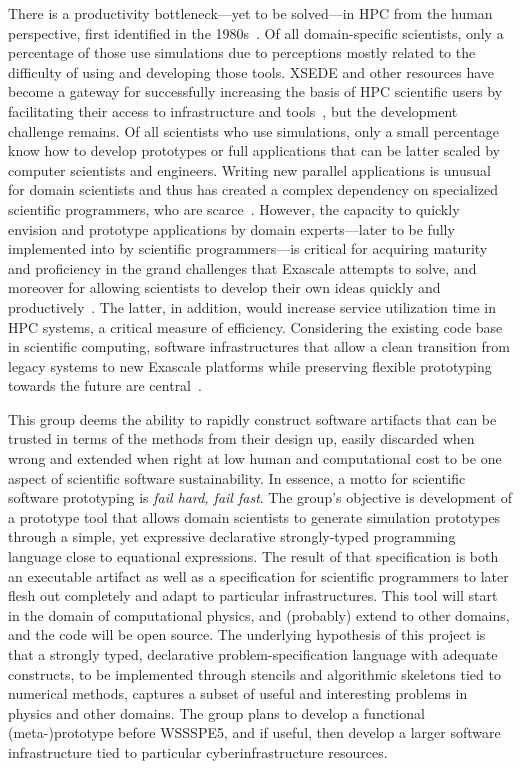 \documentclass[11pt, oneside]{amsart}
\begin{document}
There is a productivity bottleneck---yet to be solved---in HPC from the human
perspective, first identified in the 1980s~\cite{barstow1982automatic}. Of all
domain-specific scientists, only a percentage of those use simulations due to
perceptions mostly related to the difficulty of using and developing those tools.
XSEDE and other resources have become a gateway for successfully increasing the
basis of HPC scientific users by facilitating their access to infrastructure and
tools~\cite{towns2014xsede}, but the development challenge remains.
Of all scientists who use simulations, only a small percentage know how
to develop prototypes or full applications that can be latter scaled by computer
scientists and engineers. Writing new parallel applications is unusual for
domain scientists and thus has created a complex dependency on specialized
scientific programmers, who are scarce~\cite{post2005computational}. However,
the capacity to quickly envision and prototype applications by domain
experts---later to be fully implemented into by scientific programmers---is critical for
acquiring maturity and proficiency in the grand challenges that Exascale
attempts to solve, and moreover for allowing scientists to develop their own
ideas quickly and productively~\cite{vinter2015prototyping}. The latter, in
addition, would increase service utilization time in HPC systems, a critical
measure of efficiency. Considering the existing code base in scientific
computing, software infrastructures that allow a clean transition from legacy
systems to new Exascale platforms while preserving flexible prototyping
towards the future are central~\cite{hwu2015transitioning}.

This group deems the ability to rapidly construct software artifacts that can be
trusted in terms of the methods from their design up, easily discarded when
wrong and extended when right at low human and computational cost to be one
aspect of scientific software sustainability. In essence,
a motto for scientific software prototyping is \textit{fail hard, fail fast}.
%
The group's objective is development of a prototype tool that allows domain scientists to generate
simulation prototypes through a simple, yet expressive declarative
strongly-typed programming language close to equational expressions. The result
of that specification is both an executable artifact as well as a specification
for scientific programmers to later flesh out completely and adapt to particular
infrastructures. This tool will start in the domain of computational physics,
and (probably) extend to other domains, and the code will be open source.
%
The underlying hypothesis of this project is that a strongly typed, declarative
problem-specification language with adequate constructs, to be implemented
through stencils and algorithmic skeletons tied to numerical methods, captures a
 subset of useful and interesting problems in physics and other domains.
%
The group plans to develop a functional (meta-)prototype before WSSSPE5, and
if useful, then develop a larger software infrastructure tied to
particular cyberinfrastructure resources.
\end{document}
